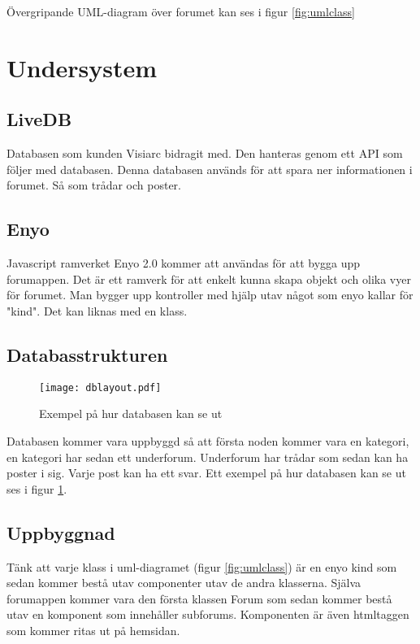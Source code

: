 \documentclass[a4paper, 12pt, titlepage]{article}
\begin{document}
    Övergripande UML-diagram över forumet kan ses i figur \ref{fig:umlclass}
    
    \section{Undersystem}
        \subsection{LiveDB}
        Databasen som kunden Visiarc bidragit med. Den hanteras genom ett API som följer med databasen.
        Denna databasen används för att spara ner informationen i forumet. Så som trådar och poster. 
        
        \subsection{Enyo}
        Javascript ramverket Enyo 2.0 kommer att användas för att bygga upp forumappen. Det är ett ramverk för att enkelt kunna skapa objekt och olika vyer för forumet. Man bygger upp kontroller med hjälp utav något som enyo kallar för "kind". Det kan liknas med en klass. 

        \subsection{Databasstrukturen}
          \begin{figure}
            \texttt{[image: dblayout.pdf]}
            \caption{Exempel på hur databasen kan se ut}
            \label{fig:dblayoutex}
          \end{figure}
          Databasen kommer vara uppbyggd så att första noden kommer vara en kategori, en kategori har sedan ett underforum. Underforum har trådar som sedan kan ha poster i sig. Varje post kan ha ett svar. Ett exempel på hur databasen kan se ut ses i figur \ref{fig:dblayoutex}.

        \subsection{Uppbyggnad}
          Tänk att varje klass i uml-diagramet (figur \ref{fig:umlclass}) är en enyo kind som sedan kommer bestå utav componenter utav de andra klasserna. Själva forumappen kommer vara den första klassen Forum som sedan kommer bestå utav en komponent som innehåller subforums. Komponenten är även htmltaggen som kommer ritas ut på hemsidan.
\end{document}
